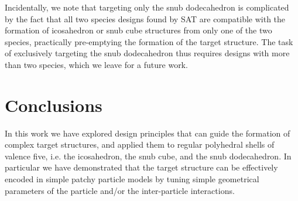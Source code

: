 \documentclass[a4paper, amsfonts, amssymb, amsmath, reprint, showkeys, nofootinbib, oneside]{revtex4-1}
\begin{document}
Incidentally, we note that targeting only the snub dodecahedron is complicated by the fact that all two species designs found by SAT are compatible with the formation of icosahedron or snub cube structures from only one of the two species, practically pre-emptying the formation of the target structure. The task of exclusively targeting the snub dodecahedron thus requires designs with more than two species, which we leave for a future work.

\section{Conclusions}

In this work we have explored design principles that can guide the formation of complex target structures, and applied them to regular polyhedral shells of valence five, i.e. the icosahedron, the snub cube, and the snub dodecahedron. In particular we have demonstrated that the target structure can be effectively encoded in simple patchy particle models by tuning simple geometrical parameters of the particle and/or the inter-particle interactions.
\end{document}
